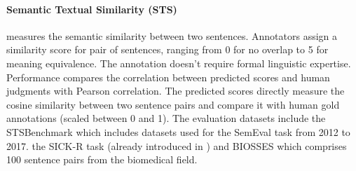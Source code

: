 \paragraph{Semantic Textual Similarity (STS)} measures the semantic similarity between two sentences. Annotators assign a similarity score for pair of sentences, ranging from 0 for no overlap to 5 for meaning equivalence. The annotation doesn't require formal linguistic expertise. Performance compares the correlation between predicted scores and human judgments with Pearson correlation. The predicted scores directly measure the cosine similarity between two sentence pairs and compare it with human gold annotations (scaled between 0 and 1). The evaluation datasets include the STSBenchmark which includes datasets used for the SemEval task from 2012 to 2017. the SICK-R task (already introduced in ) and BIOSSES  which comprises 100 sentence pairs from the biomedical field.

